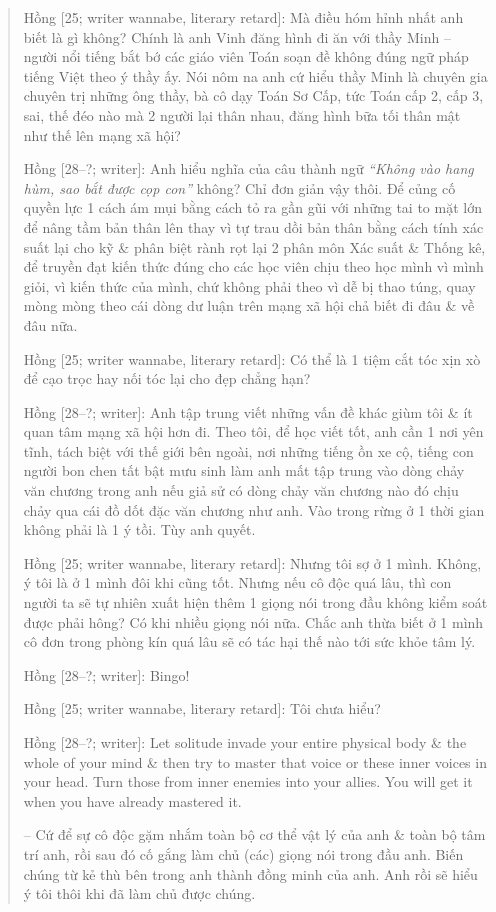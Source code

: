 \documentclass[12pt,twoside]{book}
\begin{document}
\begin{quote}
	{\sf Hồng [25; writer wannabe, literary retard]}: Mà điều hóm hỉnh nhất anh biết là gì không? Chính là anh Vinh đăng hình đi ăn với thầy Minh -- người nổi tiếng bắt bớ các giáo viên Toán soạn đề không đúng ngữ pháp tiếng Việt theo ý thầy ấy. Nói nôm na anh cứ hiểu thầy Minh là chuyên gia chuyên trị những ông thầy, bà cô dạy Toán Sơ Cấp, tức Toán cấp 2, cấp 3, sai, thế đéo nào mà 2 người lại thân nhau, đăng hình bữa tối thân mật như thế lên mạng xã hội?
	
	{\sf Hồng [28--?; writer]}: Anh hiểu nghĩa của câu thành ngữ {\it ``Không vào hang hùm, sao bắt được cọp con''} không? Chỉ đơn giản vậy thôi. Để củng cố quyền lực 1 cách ám mụi bằng cách tỏ ra gần gũi với những tai to mặt lớn để nâng tầm bản thân lên thay vì tự trau dồi bản thân bằng cách tính xác suất lại cho kỹ \& phân biệt rành rọt lại 2 phân môn Xác suất \& Thống kê, để truyền đạt kiến thức đúng cho các học viên chịu theo học mình vì mình giỏi, vì kiến thức của mình, chứ không phải theo vì dễ bị thao túng, quay mòng mòng theo cái dòng dư luận trên mạng xã hội chả biết đi đâu \& về đâu nữa.
	
	{\sf Hồng [25; writer wannabe, literary retard]}: Có thể là 1 tiệm cắt tóc xịn xò để cạo trọc hay nối tóc lại cho đẹp chẳng hạn?
	
	{\sf Hồng [28--?; writer]}: Anh tập trung viết những vấn đề khác giùm tôi \& ít quan tâm mạng xã hội hơn đi. Theo tôi, để học viết tốt, anh cần 1 nơi yên tĩnh, tách biệt với thế giới bên ngoài, nơi những tiếng ồn xe cộ, tiếng con người bon chen tất bật mưu sinh làm anh mất tập trung vào dòng chảy văn chương trong anh nếu giả sử có dòng chảy văn chương nào đó chịu chảy qua cái đồ dốt đặc văn chương như anh. Vào trong rừng ở 1 thời gian không phải là 1 ý tồi. Tùy anh quyết.
	
	{\sf Hồng [25; writer wannabe, literary retard]}: Nhưng tôi sợ ở 1 mình. Không, ý tôi là ở 1 mình đôi khi cũng tốt. Nhưng nếu cô độc quá lâu, thì con người ta sẽ tự nhiên xuất hiện thêm 1 giọng nói trong đầu không kiểm soát được phải hông? Có khi nhiều giọng nói nữa. Chắc anh thừa biết ở 1 mình cô đơn trong phòng kín quá lâu sẽ có tác hại thế nào tới sức khỏe tâm lý.
	
	{\sf Hồng [28--?; writer]}: Bingo!
	
	{\sf Hồng [25; writer wannabe, literary retard]}: Tôi chưa hiểu?
	
	{\sf Hồng [28--?; writer]}: Let solitude invade your entire physical body \& the whole of your mind \& then try to master that voice or these inner voices in your head. Turn those from inner enemies into your allies. You will get it when you have already mastered it.
	
	-- Cứ để sự cô độc gặm nhắm toàn bộ cơ thể vật lý của anh \& toàn bộ tâm trí anh, rồi sau đó cố gắng làm chủ (các) giọng nói trong đầu anh. Biến chúng từ kẻ thù bên trong anh thành đồng minh của anh. Anh rồi sẽ hiểu ý tôi thôi khi đã làm chủ được chúng.
\end{quote}
\end{document}
